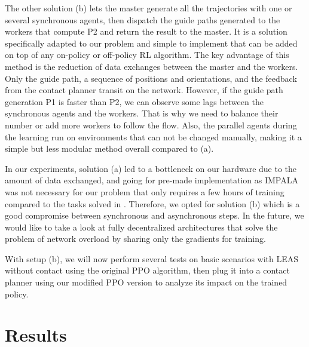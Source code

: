 The other solution (b) lets the master generate all the trajectories with one or several synchronous agents, then dispatch the guide paths generated to the workers that compute P2 and return the result to the master.
It is a solution specifically adapted to our problem and simple to implement that can be added on top of any on-policy or off-policy RL algorithm. 
The key advantage of this method is the reduction of data exchanges between the master and the workers. Only the guide path, a sequence of positions and orientations, and the feedback from the contact planner transit on the network.
However, if the guide path generation P1 is faster than P2, we can observe some lags between the synchronous agents and the workers. That is why we need to balance their number or add more workers to follow the flow. Also, the parallel agents during the learning run on environments that can not be changed manually, making it a simple but less modular method overall compared to (a).

In our experiments, solution (a) led to a bottleneck on our hardware due to the amount of data exchanged, and going for pre-made implementation as IMPALA was not necessary for our problem that only requires a few hours of training compared to the tasks solved in \cite{impala2018, openai2019dota}.
Therefore, we opted for solution (b) which is a good compromise between synchronous and asynchronous steps.
In the future, we would like to take a look at fully decentralized architectures \cite{DD_PPO} that solve the problem of network overload by sharing only the gradients for training.

With setup (b), we will now perform several tests on basic scenarios with LEAS without contact using the original PPO algorithm, then plug it into a contact planner using our modified PPO version to analyze its impact on the trained policy.


\section{Results\label{subsec:leas-results}}

